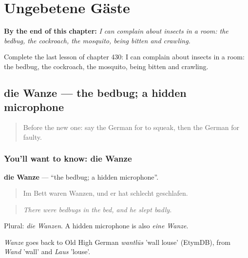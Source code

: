 
\chapter{Ungebetene Gäste}
\label{ch:ge-ungebetene-gaste}

\begin{chapteropening}
\textbf{By the end of this chapter:} \emph{I can complain about insects in a room: the bedbug, the cockroach, the mosquito, being bitten and crawling.}

Complete the last lesson of chapter 430: I can complain about insects in a room: the bedbug, the cockroach, the mosquito, being bitten and crawling.
\end{chapteropening}

\section[die Wanze]{die Wanze — the bedbug; a hidden microphone}

\label{lesson:GE-C430-wanze}



\begin{quote}
Before the new one: say the German for to squeak, then the German for faulty.
\end{quote}

\subsection*{You'll want to know: die Wanze}
\textbf{die Wanze} — \textquotedblleft{}the bedbug; a hidden microphone\textquotedblright{}.

\begin{quote}
Im Bett waren Wanzen, und er hat schlecht geschlafen.
\end{quote}

\begin{quote}
\emph{There were bedbugs in the bed, and he slept badly.}
\end{quote}

Plural: \emph{die Wanzen}. A hidden microphone is also \emph{eine Wanze}.

\begin{cousinweb}
\emph{Wanze} goes back to Old High German \emph{wantlūs} 'wall louse' (EtymDB), from \emph{Wand} 'wall' and \emph{Laus} 'louse'.
\end{cousinweb}

